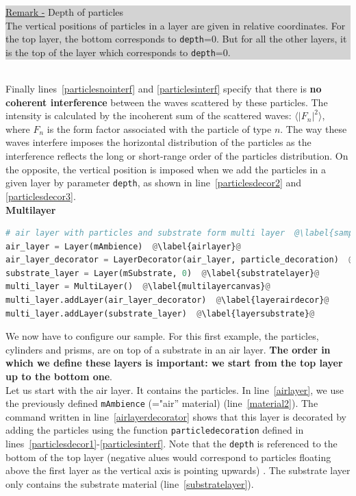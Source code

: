 \noindent {\huge\danger} 
\colorbox{Lightgray}{\parbox{\dimexpr\linewidth-8\fboxsep}
{\underline{Remark -} Depth of particles\\
The vertical positions of particles in a layer are given in relative
coordinates. For the top layer, the bottom corresponds to
\texttt{depth}=0. But for all the other layers, it is the top of the
layer which corresponds to \texttt{depth}=0.}}\\

\noindent Finally lines~\ref{particlesnointerf} and
\ref{particlesinterf} specify that there is \textbf{no coherent interference} between
the waves scattered by these particles. The intensity is calculated by
the incoherent sum of the scattered waves: $\langle |F_n|^2\rangle$,
where $F_n$ is the form factor associated with the particle of type $n$.  The way these waves
interfere imposes the horizontal distribution of
the particles as
the interference reflects the long or short-range order of the particles distribution. On the opposite, the vertical position is
imposed when we add the particles in a given layer by parameter \texttt{depth}, as shown in line~\ref{particlesdecor2} and \ref{particlesdecor3}. \\

\noindent \textbf{Multilayer}\\

\begin{lstlisting}[language=python, style=eclipseboxed,name=ex1,nolol]
# air layer with particles and substrate form multi layer  @\label{sampleassembling}@
air_layer = Layer(mAmbience)  @\label{airlayer}@
air_layer_decorator = LayerDecorator(air_layer, particle_decoration)  @\label{airlayerdecorator}@
substrate_layer = Layer(mSubstrate, 0)  @\label{substratelayer}@
multi_layer = MultiLayer()  @\label{multilayercanvas}@
multi_layer.addLayer(air_layer_decorator)  @\label{layerairdecor}@
multi_layer.addLayer(substrate_layer)  @\label{layersubstrate}@
\end{lstlisting}

\noindent We now have to configure our sample. For this first example,
the particles, cylinders and prisms, are on top of a substrate in an
air layer. \textbf{The order in which we define these layers is important: we
start from the top layer up to the bottom one}.\\

\noindent Let us start with the air layer. It contains the particles. In
line~\ref{airlayer}, we use the previously defined \texttt{mAmbience}
(="air'' material) (line~\ref{material2}). The command written in line~\ref{airlayerdecorator} shows that this layer is decorated by adding the
particles using the function \texttt{particledecoration} defined in
lines~\ref{particlesdecor1}-\ref{particlesinterf}. Note that the
\texttt{depth} is referenced to the bottom of the top layer (negative
alues would correspond to particles floating above the first layer as
the vertical axis is pointing upwards) . The substrate layer
only contains the substrate material (line~\ref{substratelayer}).\\
 
